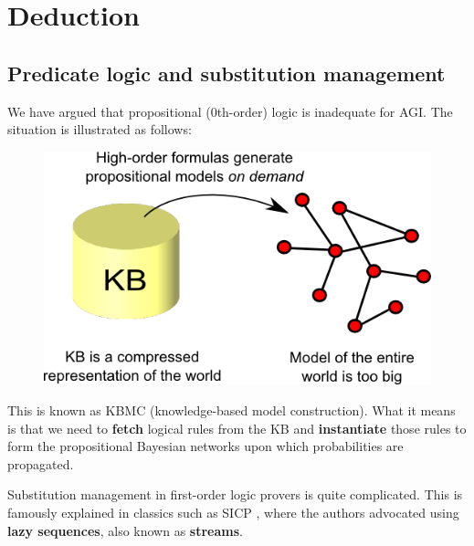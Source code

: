 \section{Deduction}
\label{sec:deduction}

\subsection{Predicate logic and substitution management}
\label{sec:substitution-management}

We have argued that propositional (0th-order) logic is inadequate for AGI.  The situation is illustrated as follows:
\begin{figure}[H]
\centering
\includegraphics{KBMC-illustrated.png}
\end{figure}
This is known as KBMC (knowledge-based model construction).  What it means is that we need to \textbf{fetch} logical rules from the KB and \textbf{instantiate} those rules to form the propositional Bayesian networks upon which probabilities are propagated.

Substitution management in first-order logic provers is quite complicated.  This is famously explained in classics such as SICP \citep*{Abelson1984}, where the authors advocated using \textbf{lazy sequences}, also known as \textbf{streams}.

